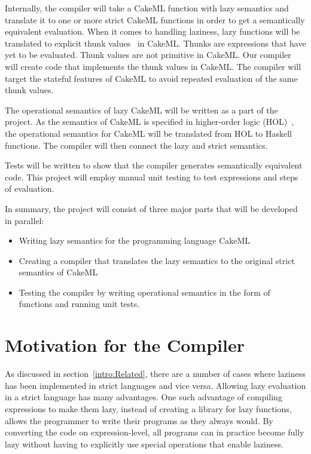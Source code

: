 Internally, the compiler will take a
CakeML function with lazy semantics and translate it to one
or more strict CakeML functions in order to get a semantically equivalent
evaluation. When it comes to handling laziness, lazy functions will be
translated to explicit thunk values~\cite{Ingerman:1961:TWC:366062.366084} in
CakeML. Thunks are expressions that have yet to be evaluated. Thunk values are
not primitive in CakeML. Our compiler will create code that
implements the thunk values in CakeML. The compiler will target the stateful
features of CakeML to avoid repeated evaluation of the same thunk values.

The operational semantics of lazy CakeML will be written as a part of the
project. As the semantics of CakeML is specified in higher-order logic
(HOL)~\cite{HOLInter57:online},
the operational semantics for CakeML will be translated from HOL to Haskell
functions. The compiler will then connect the lazy and strict semantics.

Tests will be written to show that the compiler generates semantically
equivalent code. This project will employ manual unit testing to test
expressions and steps of evaluation.

In summary, the project will consist of three major parts that will be developed
in parallel:
\begin{itemize}
 \item Writing lazy semantics for the programming language CakeML
 \item Creating a compiler that translates the lazy semantics to the original strict semantics of CakeML
 \item Testing the compiler by writing operational semantics in the form of functions and running unit tests.
\end{itemize}

\section{Motivation for the Compiler}
As discussed in section~\ref{intro:Related}, there are a number of cases where
laziness has been implemented in strict languages and vice versa. 
Allowing lazy evaluation in a strict language has many advantages.
One such advantage of compiling expressions to make them lazy, instead of creating
a library for lazy functions, allows the programmer to write their programs as
they always would. By converting the code on expression-level, all programs can
in practice become fully lazy without having to explicitly use special
operations that enable laziness.
